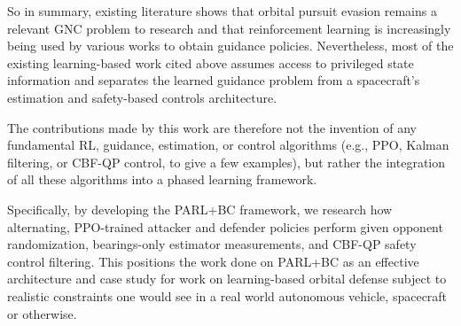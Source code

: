 So in summary, existing literature shows that orbital pursuit evasion remains a relevant GNC problem to research and that reinforcement learning is increasingly being used by various works to obtain guidance policies. Nevertheless, most of the existing learning-based work cited above assumes access to privileged state information and separates the learned guidance problem from a spacecraft's estimation and safety-based controls architecture. 

The contributions made by this work are therefore not the invention of any fundamental RL, guidance, estimation, or control algorithms (e.g., PPO, Kalman filtering, or CBF-QP control, to give a few examples), but rather the integration of all these algorithms into a phased learning framework.

Specifically, by developing the PARL+BC framework, we research how alternating, PPO-trained attacker and defender policies perform given opponent randomization, bearings-only estimator measurements, and CBF-QP safety control filtering. This positions the work done on PARL+BC as an effective architecture and case study for work on learning-based orbital defense subject to realistic constraints one would see in a real world autonomous vehicle, spacecraft or otherwise.
